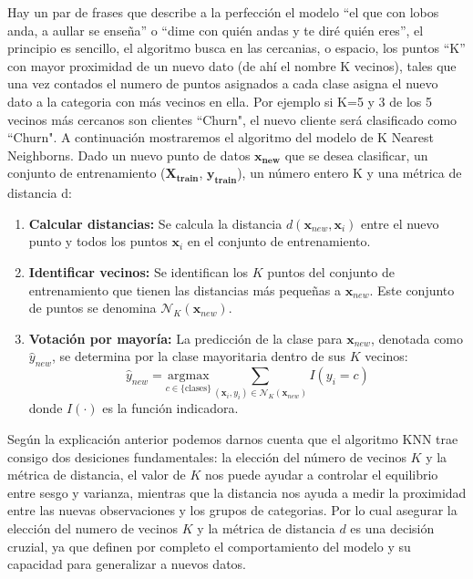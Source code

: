 Hay un par de frases que describe a la perfección el modelo ``el que con lobos anda, a aullar se enseña'' o ``dime con quién andas y te diré quién eres'', el principio es sencillo, el algoritmo busca en las cercanias, o espacio, los puntos ``K'' con mayor proximidad de un nuevo dato (de ahí el nombre K vecinos), tales que una vez contados el numero de puntos asignados a cada clase asigna el nuevo dato a la categoria con más vecinos en ella. Por ejemplo si K=5 y 3 de los 5 vecinos más cercanos son clientes ``Churn", el nuevo cliente será clasificado como ``Churn". A continuación mostraremos el algoritmo del modelo de K Nearest Neighborns. Dado un nuevo punto de datos $\mathbf{x_{new}}$ que se desea clasificar, un conjunto de entrenamiento ($\mathbf{X_{train}}$, $\mathbf{y_{train}}$), un número entero K y una métrica de distancia d:

\begin{enumerate}
	\item \textbf{Calcular distancias:} Se calcula la distancia $d(\mathbf{x}_{new}, \mathbf{x}_i)$ entre el nuevo punto y todos los puntos $\mathbf{x}_i$ en el conjunto de entrenamiento.
	\item \textbf{Identificar vecinos:} Se identifican los $K$ puntos del conjunto de entrenamiento que tienen las distancias más pequeñas a $\mathbf{x}_{new}$. Este conjunto de puntos se denomina $\mathcal{N}_K(\mathbf{x}_{new})$.
	\item \textbf{Votación por mayoría:} La predicción de la clase para $\mathbf{x}_{new}$, denotada como $\hat{y}_{new}$, se determina por la clase mayoritaria dentro de sus $K$ vecinos:
	$$
	\hat{y}_{new} = \underset{c \in \{\text{clases}\}}{\text{argmax}} \sum_{(\mathbf{x}_i, y_i) \in \mathcal{N}_K(\mathbf{x}_{new})} I(y_i = c)
	$$
	donde $I(\cdot)$ es la función indicadora.
\end{enumerate}

Según la explicación anterior podemos darnos cuenta que el algoritmo KNN trae consigo dos desiciones fundamentales: la elección del número de vecinos $K$ y la métrica de distancia, el valor de $K$ nos puede ayudar a controlar el equilibrio entre sesgo y varianza, mientras que la distancia nos ayuda a medir la proximidad entre las nuevas observaciones y los grupos de categorias. Por lo cual asegurar la elección del numero de vecinos $K$ y la métrica de distancia $d$ es una decisión cruzial, ya que definen por completo el comportamiento del modelo y su capacidad para generalizar a nuevos datos.

